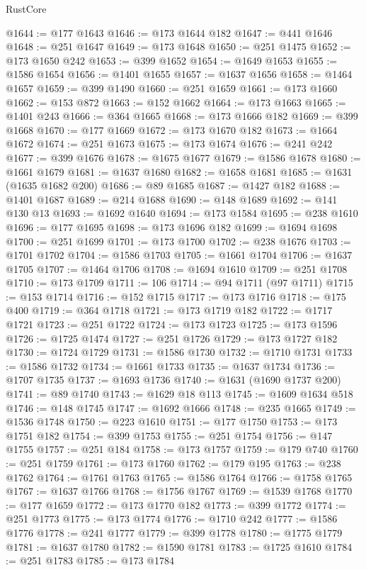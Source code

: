 \begin{lexlean}{RustCore}
\begin{coremodule}
@1644 := @177 @1643
@1646 := @173 @1644 @182
@1647 := @441 @1646
@1648 := @251 @1647
@1649 := @173 @1648
@1650 := @251 @1475
@1652 := @173 @1650 @242
@1653 := @399 @1652
@1654 := @1649 @1653
@1655 := @1586 @1654
@1656 := @1401 @1655
@1657 := @1637 @1656
@1658 := @1464 @1657
@1659 := @399 @1490
@1660 := @251 @1659
@1661 := @173 @1660
@1662 := @153 @872
@1663 := @152 @1662
@1664 := @173 @1663
@1665 := @1401 @243
@1666 := @364 @1665
@1668 := @173 @1666 @182
@1669 := @399 @1668
@1670 := @177 @1669
@1672 := @173 @1670 @182
@1673 := @1664 @1672
@1674 := @251 @1673
@1675 := @173 @1674
@1676 := @241 @242
@1677 := @399 @1676
@1678 := @1675 @1677
@1679 := @1586 @1678
@1680 := @1661 @1679
@1681 := @1637 @1680
@1682 := @1658 @1681
@1685 := @1631 (@1635 @1682 @200)
@1686 := @89 @1685
@1687 := @1427 @182
@1688 := @1401 @1687
@1689 := @214 @1688
@1690 := @148 @1689
@1692 := @141 @130 @13
@1693 := @1692 @1640
@1694 := @173 @1584
@1695 := @238 @1610
@1696 := @177 @1695
@1698 := @173 @1696 @182
@1699 := @1694 @1698
@1700 := @251 @1699
@1701 := @173 @1700
@1702 := @238 @1676
@1703 := @1701 @1702
@1704 := @1586 @1703
@1705 := @1661 @1704
@1706 := @1637 @1705
@1707 := @1464 @1706
@1708 := @1694 @1610
@1709 := @251 @1708
@1710 := @173 @1709
@1711 := 106
@1714 := @94 @1711 (@97 @1711)
@1715 := @153 @1714
@1716 := @152 @1715
@1717 := @173 @1716
@1718 := @175 @400
@1719 := @364 @1718
@1721 := @173 @1719 @182
@1722 := @1717 @1721
@1723 := @251 @1722
@1724 := @173 @1723
@1725 := @173 @1596
@1726 := @1725 @1474
@1727 := @251 @1726
@1729 := @173 @1727 @182
@1730 := @1724 @1729
@1731 := @1586 @1730
@1732 := @1710 @1731
@1733 := @1586 @1732
@1734 := @1661 @1733
@1735 := @1637 @1734
@1736 := @1707 @1735
@1737 := @1693 @1736
@1740 := @1631 (@1690 @1737 @200)
@1741 := @89 @1740
@1743 := @1629 @18 @113
@1745 := @1609 @1634 @518
@1746 := @148 @1745
@1747 := @1692 @1666
@1748 := @235 @1665
@1749 := @1536 @1748
@1750 := @223 @1610
@1751 := @177 @1750
@1753 := @173 @1751 @182
@1754 := @399 @1753
@1755 := @251 @1754
@1756 := @147 @1755
@1757 := @251 @184
@1758 := @173 @1757
@1759 := @179 @740
@1760 := @251 @1759
@1761 := @173 @1760
@1762 := @179 @195
@1763 := @238 @1762
@1764 := @1761 @1763
@1765 := @1586 @1764
@1766 := @1758 @1765
@1767 := @1637 @1766
@1768 := @1756 @1767
@1769 := @1539 @1768
@1770 := @177 @1659
@1772 := @173 @1770 @182
@1773 := @399 @1772
@1774 := @251 @1773
@1775 := @173 @1774
@1776 := @1710 @242
@1777 := @1586 @1776
@1778 := @241 @1777
@1779 := @399 @1778
@1780 := @1775 @1779
@1781 := @1637 @1780
@1782 := @1590 @1781
@1783 := @1725 @1610
@1784 := @251 @1783
@1785 := @173 @1784

\end{coremodule}
\end{lexlean}
